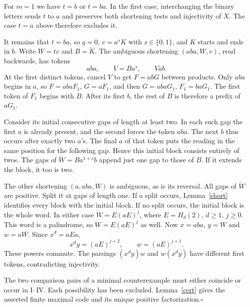 \documentclass[11pt,a4paper]{article}
\newcommand{\rev}[1]{\overleftarrow{#1}}
\begin{document}
For $m=1$ we have $t=b$ or $t=ba$. In the first case, interchanging the binary letters sends $t$ to $a$ and preserves both shortening tests and injectivity of $X$. The case $t=a$ above therefore excludes it.

It remains that $t=ba$, so $q=0$, $v=a^s K$ with $s\in\{0,1\}$, and $K$ starts and ends in $b$. Write $W=tv$ and $B=\rev K$. The ambiguous shortening $(aba,W,v)$, read backwards, has tokens
\[
                 aba,\qquad V=B a^s,\qquad Vab .
\]
At the first distinct tokens, cancel $V$ to get $F=abG$ between products. Only $aba$ begins in $a$, so $F=abaF_1$, $G=aF_1$, and then $G=abaG_1$, $F_1=baG_1$. The first token of $F_1$ begins with $B$. After its first $b$, the rest of $B$ is therefore a prefix of $aG_1$.

Consider its initial consecutive gaps of length at least two. In each such gap the first $a$ is already present, and the second forces the token $aba$. The next $b$ thus occurs after exactly two $a$'s. The final $a$ of that token puts the reading in the same position for the following gap. Hence this initial block consists entirely of twos. The gaps of $\rev W=B a^{1+s}b$ append just one gap to those of $B$. If it extends the block, it too is two.

The other shortening $(a,aba,W)$ is ambiguous, as is its reversal. All gaps of $\rev W$ are positive. Split it at gaps of length one. If a split occurs, Lemma~\ref{short} identifies every block with the initial block. If no split occurs, the initial block is the whole word. In either case $\rev W=E(aE)^j$, where $E=H_d(2)$, $d\ge1$, $j\ge0$. This word is a palindrome, so $W=E(aE)^j$ as well. Now $x=aba$, $y=W$ and $w=aW$. Since $x^d=aEa$,
\[
                      x^d y=(aE)^{j+2},\qquad w=(aE)^{j+1}.
\]
These powers commute. The parsings $(x^d y)w$ and $w(x^d y)$ have different first tokens, contradicting injectivity.

The two comparison pairs of a minimal counterexample must either coincide or occur in I--IV. Each possibility has been excluded. Lemma~\ref{cert} gives the asserted finite maximal code and its unique positive factorization.\hfill$\square$
\end{document}

